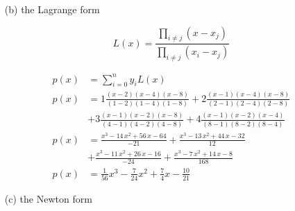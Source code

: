{\begin{enumerate}
\item[(b) the Lagrange form]

\[
L(x) = \frac{\prod_{i \ne j} (x - x_j)}{\prod_{i \ne j} (x_i - x_j)}
\]

\[
\begin{aligned}
  p(x) &= \sum_{i=0}^n y_i L(x) \\
  p(x) &= 1 \frac{(x-2)(x-4)(x-8)}{(1-2)(1-4)(1-8)} + 2 \frac{(x-1)(x-4)(x-8)}{(2-1)(2-4)(2-8)} \\
  &    + 3 \frac{(x-1)(x-2)(x-8)}{(4-1)(4-2)(4-8)} + 4 \frac{(x-1)(x-2)(x-4)}{(8-1)(8-2)(8-4)}\\
  p(x) &= \frac{x^3 - 14\, x^2 + 56\, x - 64}{-21} + \frac{x^3 - 13\, x^2 + 44\, x - 32}{12} \\
&    + \frac{x^3 - 11\, x^2 + 26\, x - 16}{-24} + \frac{x^3 - 7\, x^2 + 14\, x - 8}{168} \\
p(x) &= \frac{1}{56} x^3 - \frac{7}{24} x^2 + \frac{7}{4} x - \frac{10}{21}
\end{aligned}
\]

\item[(c) the Newton form]


\end{enumerate}}
